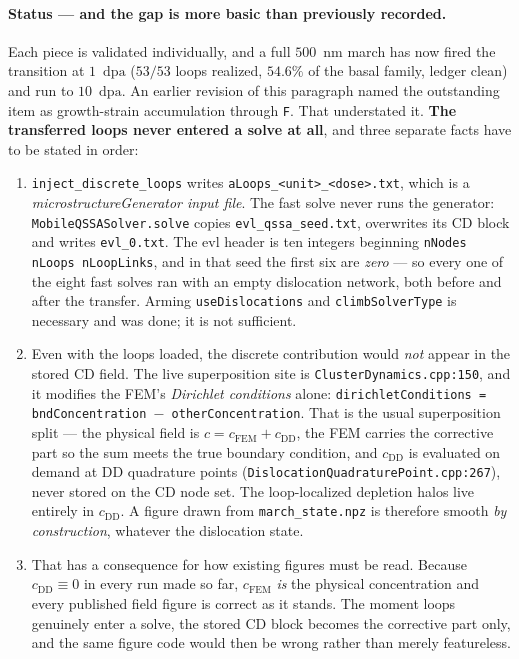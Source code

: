 \documentclass[11pt,a4paper]{article}
\newcommand{\code}[1]{\texttt{\small #1}}
\newcommand{\dpa}{\ensuremath{\mathrm{dpa}}}
\begin{document}
\paragraph{Status --- and the gap is more basic than previously recorded.} Each
piece is validated individually, and a full $500$~nm march has now fired the
transition at $1$~\dpa{} ($53/53$ loops realized, $54.6\%$ of the basal family,
ledger clean) and run to $10$~\dpa. An earlier revision of this paragraph named
the outstanding item as growth-strain accumulation through \code{F}. That
understated it. \textbf{The transferred loops never entered a solve at all}, and
three separate facts have to be stated in order:

\begin{enumerate}\itemsep3pt
\item \code{inject\_discrete\_loops} writes \code{aLoops\_<unit>\_<dose>.txt},
      which is a \emph{microstructureGenerator input file}. The fast solve never
      runs the generator: \code{MobileQSSASolver.solve} copies
      \code{evl\_qssa\_seed.txt}, overwrites its CD block and writes
      \code{evl\_0.txt}. The evl header is ten integers beginning
      \code{nNodes nLoops nLoopLinks}, and in that seed the first six are
      \emph{zero} --- so every one of the eight fast solves ran with an empty
      dislocation network, both before and after the transfer. Arming
      \code{useDislocations} and \code{climbSolverType} is necessary and was
      done; it is not sufficient.

\item Even with the loops loaded, the discrete contribution would \emph{not}
      appear in the stored CD field. The live superposition site is
      \code{ClusterDynamics.cpp:150}, and it modifies the FEM's \emph{Dirichlet
      conditions} alone:
      \code{dirichletConditions = bndConcentration $-$ otherConcentration}. That
      is the usual superposition split --- the physical field is
      $c = c_{\text{FEM}} + c_{\text{DD}}$, the FEM carries the corrective part
      so the sum meets the true boundary condition, and $c_{\text{DD}}$ is
      evaluated on demand at DD quadrature points
      (\code{DislocationQuadraturePoint.cpp:267}), never stored on the CD node
      set. The loop-localized depletion halos live entirely in $c_{\text{DD}}$.
      A figure drawn from \code{march\_state.npz} is therefore smooth
      \emph{by construction}, whatever the dislocation state.

\item That has a consequence for how existing figures must be read.
      Because $c_{\text{DD}} \equiv 0$ in every run made so far,
      $c_{\text{FEM}}$ \emph{is} the physical concentration and every published
      field figure is correct as it stands. The moment loops genuinely enter a
      solve, the stored CD block becomes the corrective part only, and the same
      figure code would then be wrong rather than merely featureless.
\end{enumerate}
\end{document}

